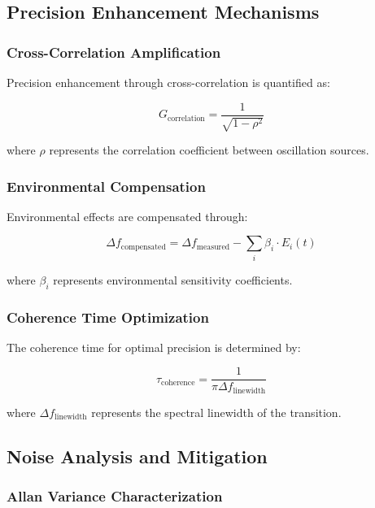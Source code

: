 \documentclass[12pt,a4paper]{article}
\begin{document}
{\subsection{Precision Enhancement Mechanisms}

\subsubsection{Cross-Correlation Amplification}

Precision enhancement through cross-correlation is quantified as:

\begin{equation}
G_{\text{correlation}} = \frac{1}{\sqrt{1 - \rho^2}}
\end{equation}

where $\rho$ represents the correlation coefficient between oscillation sources.

\subsubsection{Environmental Compensation}

Environmental effects are compensated through:

\begin{equation}
\Delta f_{\text{compensated}} = \Delta f_{\text{measured}} - \sum_{i} \beta_i \cdot E_i(t)
\end{equation}

where $\beta_i$ represents environmental sensitivity coefficients.

\subsubsection{Coherence Time Optimization}

The coherence time for optimal precision is determined by:

\begin{equation}
\tau_{\text{coherence}} = \frac{1}{\pi \Delta f_{\text{linewidth}}}
\end{equation}

where $\Delta f_{\text{linewidth}}$ represents the spectral linewidth of the transition.

\subsection{Noise Analysis and Mitigation}

\subsubsection{Allan Variance Characterization}

}
\end{document}
